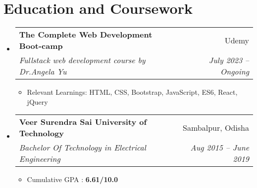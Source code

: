 \documentclass[letterpaper,11pt]{article}
\makeatletter
\newcommand{\resumeItem}[1]{
  \item\small{
    {#1 \vspace{-2pt}}
  }
}
\newcommand{\resumeSubheading}[4]{
  \vspace{-2pt}\item
    \begin{tabular*}{0.97\textwidth}[t]{l@{\extracolsep{\fill}}r}
      \textbf{#1} & #2 \\
      \textit{\small#3} & \textit{\small #4} \\
    \end{tabular*}\vspace{-7pt}
}
\newcommand{\resumeSubHeadingListStart}{\begin{itemize}[leftmargin=0.15in, label={}]}
\newcommand{\resumeSubHeadingListEnd}{\end{itemize}}
\newcommand{\resumeItemListStart}{\begin{itemize}}
\newcommand{\resumeItemListEnd}{\end{itemize}\vspace{-5pt}}
\makeatother
\begin{document}
\section{Education and Coursework} 
  \resumeSubHeadingListStart
    \resumeSubheading
      {The Complete Web Development Boot-camp
}{ Udemy}
      { Fullstack web development course by Dr.Angela Yu}{July 2023 -- Ongoing}
      \resumeItemListStart
        \resumeItem{Relevant Learnings: HTML, CSS, Bootstrap, JavaScript, ES6, React, jQuery}
      \resumeItemListEnd
    \resumeSubheading
      {Veer Surendra Sai University of Technology}{Sambalpur, Odisha}
      {Bachelor Of Technology in Electrical Engineering}{Aug 2015 -- June 2019}
       \resumeItemListStart
        \resumeItem{Cumulative GPA : \textbf{6.61/10.0}}
      \resumeItemListEnd
  \resumeSubHeadingListEnd

\end{document}
